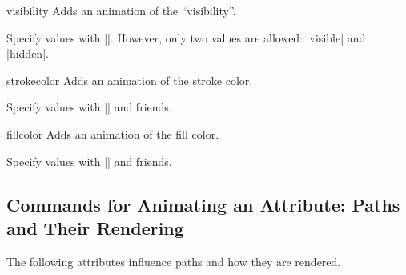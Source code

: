 \begin{sysanimateattribute}{visibility}
    Adds an animation of the ``visibility''.

    Specify values with |\pgfsysanimvaltext|. However, only two values are
    allowed: |visible| and |hidden|.
\begin{codeexample}[imagesource={standalone/pgfmanual-en-pgfsys-animations-animation-6.svg}]
\end{codeexample}
\end{sysanimateattribute}

\begin{sysanimateattribute}{strokecolor}
    Adds an animation of the stroke color.

    Specify values with |\pgfsysanimvalcolorrgb| and friends.
\begin{codeexample}[imagesource={standalone/pgfmanual-en-pgfsys-animations-animation-7.svg}]
\end{codeexample}
\end{sysanimateattribute}

\begin{sysanimateattribute}{fillcolor}
    Adds an animation of the fill color.

    Specify values with |\pgfsysanimvalcolorrgb| and friends.
\begin{codeexample}[imagesource={standalone/pgfmanual-en-pgfsys-animations-animation-8.svg}]
\end{codeexample}
\end{sysanimateattribute}


\subsection{Commands for Animating an Attribute: Paths and Their Rendering}

The following attributes influence paths and how they are rendered.


